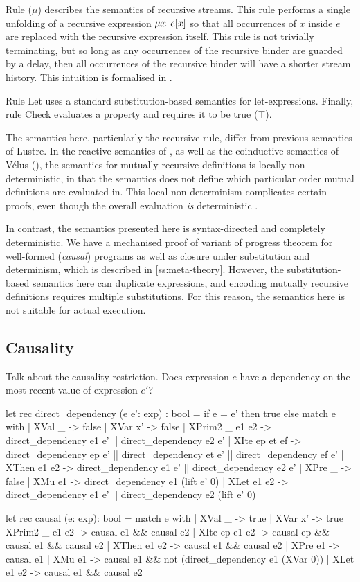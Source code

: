 \documentclass[sigplan,screen]{acmart}
\begin{document}
Rule ($\mu{}$) describes the semantics of recursive streams.
This rule performs a single unfolding of a recursive expression $\mu{} x \!.~e[x]$ so that all occurrences of $x$ inside $e$ are replaced with the recursive expression itself.
This rule is not trivially terminating, but so long as any occurrences of the recursive binder are guarded by a delay, then all occurrences of the recursive binder will have a shorter stream history.
This intuition is formalised in \REF{}.

Rule Let uses a standard substitution-based semantics for let-expressions.
Finally, rule Check evaluates a property and requires it to be true ($\top$).

The semantics here, particularly the recursive rule, differ from previous semantics of Lustre.
In the reactive semantics of \citet{caspi1995functional}, as well as the coinductive semantics of Vélus \cite{bourke2017formally} (), the semantics for mutually recursive definitions is locally non-deterministic, in that the semantics does not define which particular order mutual definitions are evaluated in.
This local non-determinism complicates certain proofs, even though the overall evaluation \emph{is} deterministic .

In contrast, the semantics presented here is syntax-directed and completely deterministic.
We have a mechanised proof of variant of progress theorem for well-formed (\emph{causal}) programs as well as closure under substitution and determinism, which is described in \autoref{ss:meta-theory}.
However, the substitution-based semantics here can duplicate expressions, and encoding mutually recursive definitions requires multiple substitutions.
For this reason, the semantics here is not suitable for actual execution.

\subsection{Causality}
\label{ss:causality}

Talk about the causality restriction.
Does expression $e$ have a dependency on the most-recent value of expression $e'$?

\begin{code}
let rec direct_dependency (e e': exp) : bool =
  if e = e' then true
  else
  match e with
  | XVal _ -> false
  | XVar x' -> false
  | XPrim2 _ e1 e2 -> direct_dependency e1 e' || direct_dependency e2 e'
  | XIte ep et ef -> direct_dependency ep e' || direct_dependency et e' || direct_dependency ef e'
  | XThen e1 e2 -> direct_dependency e1 e' || direct_dependency e2 e'
  | XPre _ -> false
  | XMu e1 -> direct_dependency e1 (lift e' 0)
  | XLet e1 e2 -> direct_dependency e1 e' || direct_dependency e2 (lift e' 0)

let rec causal (e: exp): bool =
  match e with
  | XVal _ -> true
  | XVar x' -> true
  | XPrim2 _ e1 e2 -> causal e1 && causal e2
  | XIte ep e1 e2 -> causal ep && causal e1 && causal e2
  | XThen e1 e2 -> causal e1 && causal e2
  | XPre e1 -> causal e1
  | XMu e1 -> causal e1 && not (direct_dependency e1 (XVar 0))
  | XLet e1 e2 -> causal e1 && causal e2
\end{code}
\end{document}
